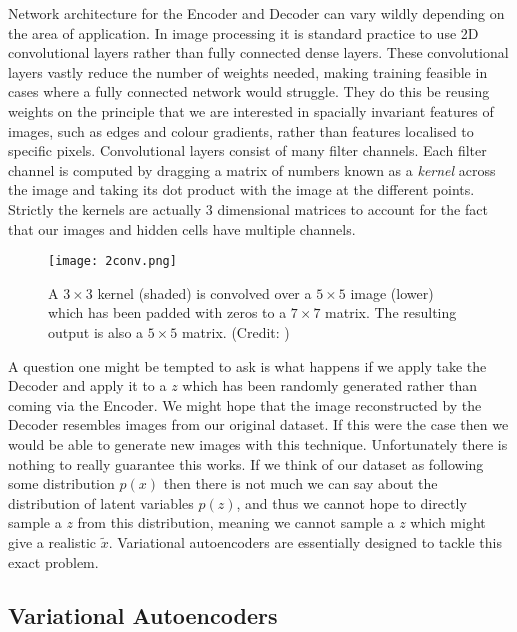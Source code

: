 \documentclass{article}
\numberwithin{figure}{section}
\theoremstyle{definition}
\begin{document}
Network architecture for the Encoder and Decoder can vary wildly depending on the area of application.
In image processing it is standard practice to use 2D convolutional layers rather than fully connected dense layers.
These convolutional layers vastly reduce the number of weights needed, making training feasible in cases where a fully connected network would struggle.
They do this be reusing weights on the principle that we are interested in spacially invariant features of images, such as edges and colour gradients, rather than features localised to specific pixels.
Convolutional layers consist of many filter channels.
Each filter channel is computed by dragging a matrix of numbers known as a \textit{kernel} across the image and taking its dot product with the image at the different points.
Strictly the kernels are actually 3 dimensional matrices to account for the fact that our images and hidden cells have multiple channels.

\begin{figure}[h]
  \centering
  \texttt{[image: 2conv.png]}
  \caption{A $3 \times 3$ kernel (shaded) is convolved over a $5 \times 5$ image (lower) which has been padded with zeros to a $7 \times 7$ matrix. The resulting output is also a $5 \times 5$ matrix. (Credit: \cite{understandingConvolutions})}
\end{figure} %

A question one might be tempted to ask is what happens if we apply take the Decoder and apply it to a $z$ which has been randomly generated rather than coming via the Encoder.
We might hope that the image reconstructed by the Decoder resembles images from our original dataset.
If this were the case then we would be able to generate new images with this technique.
Unfortunately there is nothing to really guarantee this works.
If we think of our dataset as following some distribution $p(x)$ then there is not much we can say about the distribution of latent variables $p(z)$, and thus we cannot hope to directly sample a $z$ from this distribution, meaning we cannot sample a $z$ which might give a realistic $\widetilde{x}$.
Variational autoencoders are essentially designed to tackle this exact problem.


\subsection{Variational Autoencoders}
\end{document}
